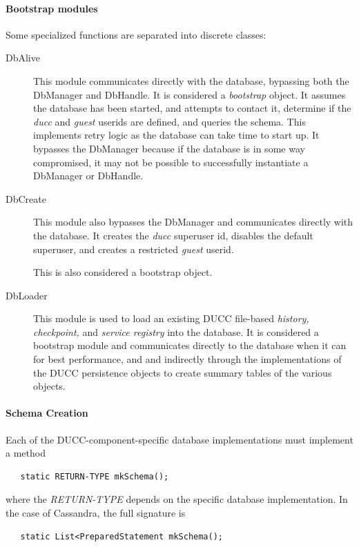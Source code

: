      \paragraph{Bootstrap modules} Some specialized functions are separated into discrete classes:
     \begin{description}
       \item[DbAlive] This module communicates directly with the database, bypassing both
         the DbManager and DbHandle.  It is considered a {\em bootstrap} object.  It assumes
         the database has been started, and attempts to contact it, determine if the
         {\em ducc} and {\em guest} userids are defined, and queries the schema.  This
         implements retry logic as the database can take time to start up.  It bypasses
         the DbManager because if the database is in some way compromised, it may not be
         possible to successfully instantiate a DbManager or DbHandle.
       \item[DbCreate] This module also bypasses the DbManager and communicates directly
         with the database.  It creates the {\em ducc} superuser id, disables the
         default superuser, and creates a restricted {\em guest} userid.

         This is also considered a bootstrap object.
       \item[DbLoader] This module is used to load an existing DUCC file-based {\em history,
           checkpoint,} and {\em service registry} into the database.  It is considered a bootstrap
         module and communicates directly to the database when it can for best performance, and and
         indirectly through the implementations of the DUCC persistence objects to create summary
         tables of the various objects.
     \end{description}
     
     \paragraph{Schema Creation}
     Each of the DUCC-component-specific database implementations must implement a method
\begin{verbatim}
   static RETURN-TYPE mkSchema();
\end{verbatim}
     where the {\em RETURN-TYPE} depends on the specific database implementation.  In the case
     of Cassandra, the full signature is
\begin{verbatim}
   static List<PreparedStatement mkSchema();
\end{verbatim}

